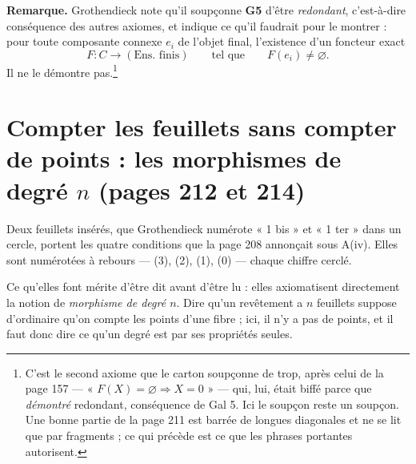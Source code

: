 \documentclass[11pt,a4paper]{article}
\begin{document}
\textbf{Remarque.} Grothendieck note qu'il soupçonne \textbf{G5} d'être
\emph{redondant}, c'est-à-dire conséquence des autres axiomes, et indique ce
qu'il faudrait pour le montrer : pour toute composante connexe $e_{i}$ de
l'objet final, l'existence d'un foncteur exact
\[
  F : C \longrightarrow (\text{Ens.\ finis}) \qquad \text{tel que}
  \qquad F(e_{i}) \neq \varnothing .
\]
Il ne le démontre pas.\footnote{C'est le second axiome que le carton
soupçonne de trop, après celui de la page 157 --- « $F(X) = \varnothing
\Rightarrow X = 0$ » --- qui, lui, était biffé parce que \emph{démontré}
redondant, conséquence de Gal 5. Ici le soupçon reste un soupçon. Une bonne
partie de la page 211 est barrée de longues diagonales et ne se lit que par
fragments ; ce qui précède est ce que les phrases portantes autorisent.}

\section*{Compter les feuillets sans compter de points : les morphismes de degré $n$ (pages 212 et 214)}

Deux feuillets insérés, que Grothendieck numérote « 1 bis » et « 1 ter » dans
un cercle, portent les quatre conditions que la page 208 annonçait sous A(iv).
Elles sont numérotées à rebours --- (3), (2), (1), (0) --- chaque chiffre
cerclé.

Ce qu'elles font mérite d'être dit avant d'être lu : elles axiomatisent
directement la notion de \emph{morphisme de degré $n$}. Dire qu'un revêtement a
$n$ feuillets suppose d'ordinaire qu'on compte les points d'une fibre ; ici, il
n'y a pas de points, et il faut donc dire ce qu'un degré est par ses
propriétés seules.
\end{document}
